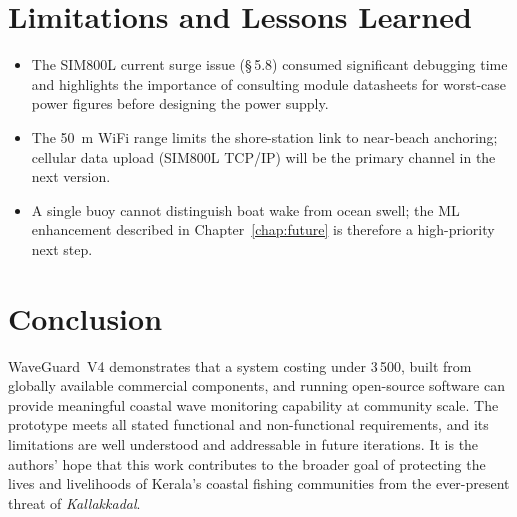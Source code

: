 \section{Limitations and Lessons Learned}

\begin{itemize}
  \item The SIM800L current surge issue (\S\,5.8) consumed significant debugging
        time and highlights the importance of consulting module datasheets for
        worst-case power figures before designing the power supply.
  \item The 50~m WiFi range limits the shore-station link to near-beach anchoring;
        cellular data upload (SIM800L TCP/IP) will be the primary channel in the
        next version.
  \item A single buoy cannot distinguish boat wake from ocean swell; the ML
        enhancement described in Chapter~\ref{chap:future} is therefore a
        high-priority next step.
\end{itemize}

\section{Conclusion}

WaveGuard~V4 demonstrates that a system costing under \INR{}3\,500, built from
globally available commercial components, and running open-source software can
provide meaningful coastal wave monitoring capability at community scale.
The prototype meets all stated functional and non-functional requirements, and its
limitations are well understood and addressable in future iterations.
It is the authors' hope that this work contributes to the broader goal of protecting
the lives and livelihoods of Kerala's coastal fishing communities from the
ever-present threat of \textit{Kallakkadal}.
